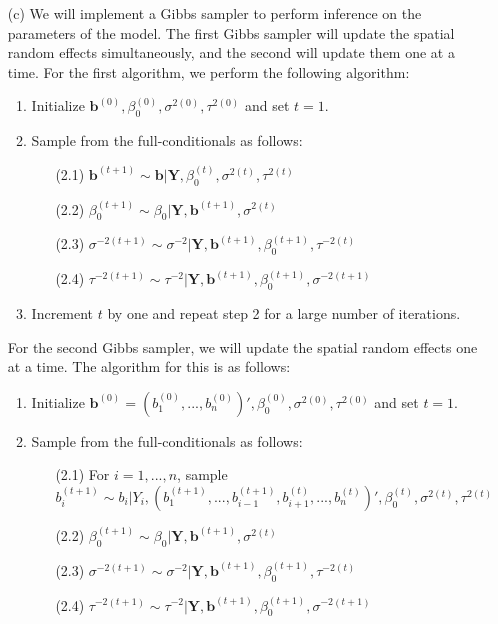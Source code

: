 \documentclass[11pt]{article}
\begin{document}
\begin{itemize}
\item[(c)]  We will implement a Gibbs sampler to perform inference on the parameters of the model.  The first Gibbs sampler will update the spatial random effects simultaneously, and the second will update them one at a time.  For the first algorithm, we perform the following algorithm:
\begin{enumerate}
\item Initialize $\mathbf{b}^{(0)}, \beta_0^{(0)}, \sigma^{2(0)},\tau^{2(0)}$ and set $t=1$.
\item Sample from the full-conditionals as follows:
\begin{enumerate}
\item[(2.1)] $\mathbf{b}^{(t+1)} \sim \mathbf{b}|\mathbf{Y},\beta_0^{(t)},\sigma^{2(t)},\tau^{2(t)}$
\item[(2.2)] $\beta_0^{(t+1)} \sim \beta_0|\mathbf{Y},\mathbf{b}^{(t+1)},\sigma^{2(t)}$
\item[(2.3)] $\sigma^{-2(t+1)} \sim \sigma^{-2}|\mathbf{Y},\mathbf{b}^{(t+1)},\beta_0^{(t+1)},\tau^{-2(t)}$
\item[(2.4)] $\tau^{-2(t+1)} \sim \tau^{-2}|\mathbf{Y},\mathbf{b}^{(t+1)},\beta_0^{(t+1)},\sigma^{-2(t+1)}$
\end{enumerate}
\item Increment $t$ by one and repeat step 2 for a large number of iterations.
\end{enumerate}
For the second Gibbs sampler, we will update the spatial random effects one at a time.  The algorithm for this is as follows:
\begin{enumerate}
\item Initialize $\mathbf{b}^{(0)} = (b_1^{(0)},...,b_n^{(0)})', \beta_0^{(0)}, \sigma^{2(0)},\tau^{2(0)}$ and set $t=1$.
\item Sample from the full-conditionals as follows:
\begin{enumerate}
\item[(2.1)] For $i=1,...,n$, sample $b_i^{(t+1)} \sim b_i|Y_i,(b_1^{(t+1)},...,b_{i-1}^{(t+1)},b_{i+1}^{(t)},...,b_n^{(t)})',\beta_0^{(t)},\sigma^{2(t)},\tau^{2(t)}$
\item[(2.2)] $\beta_0^{(t+1)} \sim \beta_0|\mathbf{Y},\mathbf{b}^{(t+1)},\sigma^{2(t)}$
\item[(2.3)] $\sigma^{-2(t+1)} \sim \sigma^{-2}|\mathbf{Y},\mathbf{b}^{(t+1)},\beta_0^{(t+1)},\tau^{-2(t)}$
\item[(2.4)] $\tau^{-2(t+1)} \sim \tau^{-2}|\mathbf{Y},\mathbf{b}^{(t+1)},\beta_0^{(t+1)},\sigma^{-2(t+1)}$
\end{enumerate}

\end{enumerate}
\end{itemize}
\end{document}
